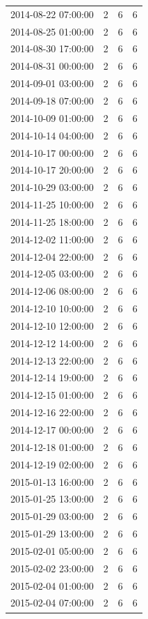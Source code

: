 \begin{tabular}{lrrr}
2014-08-22 07:00:00 & 2 & 6 & 6 \\
2014-08-25 01:00:00 & 2 & 6 & 6 \\
2014-08-30 17:00:00 & 2 & 6 & 6 \\
2014-08-31 00:00:00 & 2 & 6 & 6 \\
2014-09-01 03:00:00 & 2 & 6 & 6 \\
2014-09-18 07:00:00 & 2 & 6 & 6 \\
2014-10-09 01:00:00 & 2 & 6 & 6 \\
2014-10-14 04:00:00 & 2 & 6 & 6 \\
2014-10-17 00:00:00 & 2 & 6 & 6 \\
2014-10-17 20:00:00 & 2 & 6 & 6 \\
2014-10-29 03:00:00 & 2 & 6 & 6 \\
2014-11-25 10:00:00 & 2 & 6 & 6 \\
2014-11-25 18:00:00 & 2 & 6 & 6 \\
2014-12-02 11:00:00 & 2 & 6 & 6 \\
2014-12-04 22:00:00 & 2 & 6 & 6 \\
2014-12-05 03:00:00 & 2 & 6 & 6 \\
2014-12-06 08:00:00 & 2 & 6 & 6 \\
2014-12-10 10:00:00 & 2 & 6 & 6 \\
2014-12-10 12:00:00 & 2 & 6 & 6 \\
2014-12-12 14:00:00 & 2 & 6 & 6 \\
2014-12-13 22:00:00 & 2 & 6 & 6 \\
2014-12-14 19:00:00 & 2 & 6 & 6 \\
2014-12-15 01:00:00 & 2 & 6 & 6 \\
2014-12-16 22:00:00 & 2 & 6 & 6 \\
2014-12-17 00:00:00 & 2 & 6 & 6 \\
2014-12-18 01:00:00 & 2 & 6 & 6 \\
2014-12-19 02:00:00 & 2 & 6 & 6 \\
2015-01-13 16:00:00 & 2 & 6 & 6 \\
2015-01-25 13:00:00 & 2 & 6 & 6 \\
2015-01-29 03:00:00 & 2 & 6 & 6 \\
2015-01-29 13:00:00 & 2 & 6 & 6 \\
2015-02-01 05:00:00 & 2 & 6 & 6 \\
2015-02-02 23:00:00 & 2 & 6 & 6 \\
2015-02-04 01:00:00 & 2 & 6 & 6 \\
2015-02-04 07:00:00 & 2 & 6 & 6 \\

\end{tabular}
